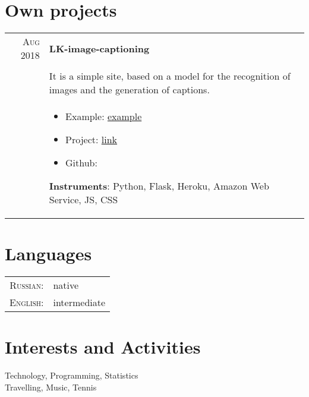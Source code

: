 \documentclass[a4paper,10pt]{article}
\begin{document}
\section{Own projects}
\begin{tabular}{r|p{11cm}}
 \textsc{Aug 2018 } & \textbf{LK-image-captioning}\\ \\
 {} & It is a simple site, based on a model for the recognition of images and the generation of captions. \\ 
 {} & \begin{itemize}  
 \item Example: \href{https://github.com/ValeraKaravai/app_image_captioning/blob/master/example.png}{example}
 \item Project: \href{https://lk-image-caprtioning.herokuapp.com/}{link}
 \item Github: \href{https://github.com/ValeraKaravai/app_image_captioning}{\ci{\faGithub}} 
 \end{itemize}
 \textbf{Instruments}: Python, Flask, Heroku, Amazon Web Service, JS, CSS
\end{tabular}


\section{Languages}
\begin{tabular}{rl}
\textsc{Russian:}&native\\
\textsc{English:}&intermediate\\
\end{tabular}


\section{Interests and Activities}
Technology, Programming, Statistics\\
Travelling, Music, Tennis
\end{document}

